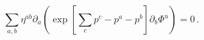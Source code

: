\begin{equation}
\sum_{a,b}\eta^{ab}\partial _a(\exp[\sum_cp^c-p^a-p^b]\partial_b\Phi^u)=0\, .
\end{equation}

